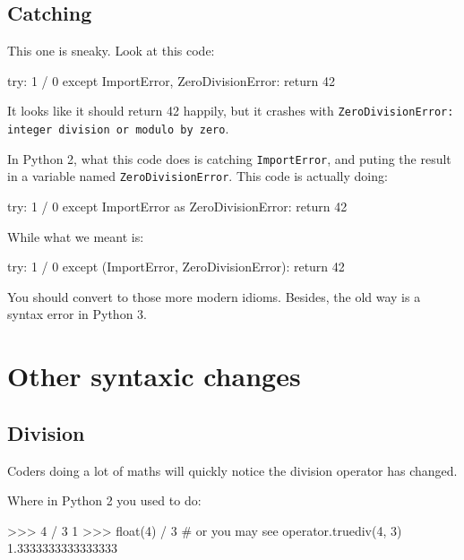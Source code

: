 \subsection{Catching}

This one is sneaky. Look at this code:

\begin{py2}
try:
    1 / 0
except ImportError, ZeroDivisionError:
    return 42
\end{py2}

It looks like it should return 42 happily, but it crashes with \lstinline{ZeroDivisionError: integer division or modulo by zero}.

In Python 2, what this code does is catching \lstinline{ImportError}, and puting the result in a variable named \lstinline{ZeroDivisionError}. This code is actually doing:

\begin{py2}
try:
    1 / 0
except ImportError as ZeroDivisionError:
    return 42
\end{py2}

While what we meant is:

\begin{py2}
try:
    1 / 0
except (ImportError, ZeroDivisionError):
    return 42
\end{py2}

You should convert to those more modern idioms. Besides, the old way is a syntax error in Python 3.















\section{Other syntaxic changes}

\subsection{Division}

Coders doing a lot of maths will quickly notice the division operator has changed.

Where in Python 2 you used to do:

\begin{py2}
>>> 4 / 3
1
>>> float(4) / 3  # or you may see operator.truediv(4, 3)
1.3333333333333333
\end{py2}

